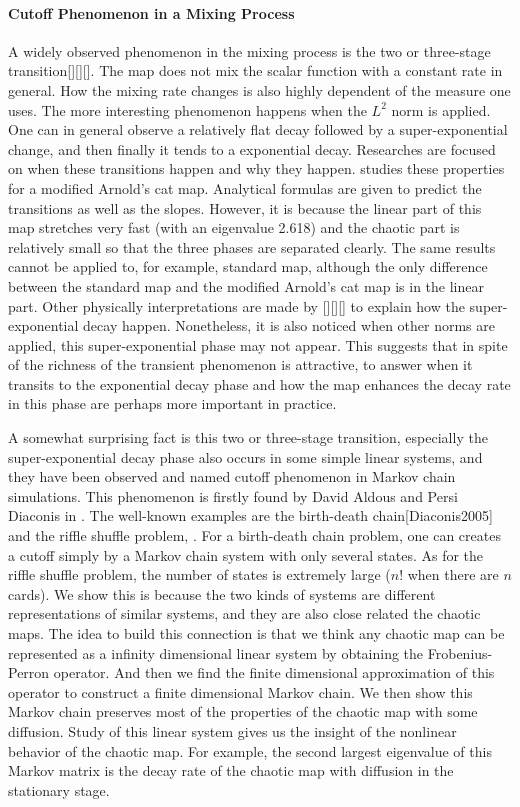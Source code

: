 \documentclass{article}
\begin{document}
\paragraph{Cutoff Phenomenon in a Mixing Process}
A widely observed phenomenon in the mixing process is the two or
three-stage transition\cite{Thiffeault2003-13}[][][]. The map does
not mix the scalar function with a constant rate in general. How the
mixing rate changes is also highly dependent of the measure one
uses. The more interesting phenomenon happens when the $L^2$ norm is
applied. One can in general observe a relatively flat decay followed
by a super-exponential change, and then finally it tends to a
exponential decay. Researches are focused on when these transitions
happen and why they happen. \cite{Thiffeault2003-13} studies these
properties for a modified Arnold's cat map. Analytical formulas are
given to predict the transitions as well as the slopes. However, it
is because the linear part of this map stretches very fast (with an
eigenvalue 2.618) and the chaotic part is relatively small so that
the three phases are separated clearly. The same results cannot be
applied to, for example, standard map, although the only difference
between the standard map and the modified Arnold's cat map is in the
linear part. Other physically interpretations are made by [][][] to
explain how the super-exponential decay happen. Nonetheless, it is
also noticed when other norms are applied, this super-exponential
phase may not appear. This suggests that in spite of the richness of
the transient phenomenon is attractive, to answer when it transits
to the exponential decay phase and how the map enhances the decay
rate in this phase are perhaps more important in practice.

A somewhat surprising fact is this two or three-stage transition,
especially the super-exponential decay phase also occurs in some
simple linear systems, and they have been observed and named cutoff
phenomenon in Markov chain simulations. This phenomenon is firstly
found by David Aldous and Persi Diaconis in \cite{Diaconis1986}. The
well-known examples are the birth-death chain[Diaconis2005] and the
riffle shuffle problem\cite{Diaconis1996}, \cite{Diaconis2001}. For
a birth-death chain problem, one can creates a cutoff simply by a
Markov chain system with only several states. As for the riffle
shuffle problem, the number of states is extremely large ($n!$ when
there are $n$ cards). We show this is because the two kinds of
systems are different representations of similar systems, and they
are also close related the chaotic maps. The idea to build this
connection is that we think any chaotic map can be represented as a
infinity dimensional linear system by obtaining the Frobenius-Perron
operator. And then we find the finite dimensional approximation of
this operator to construct a finite dimensional Markov chain. We
then show this Markov chain preserves most of the properties of the
chaotic map with some diffusion. Study of this linear system gives
us the insight of the nonlinear behavior of the chaotic map. For
example, the second largest eigenvalue of this Markov matrix is the
decay rate of the chaotic map with diffusion in the stationary
stage.
\end{document}

